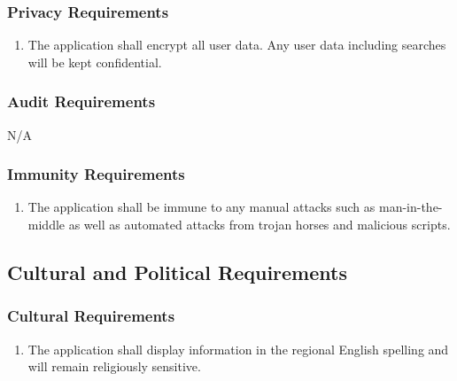 \documentclass[titlepage]{article}
\newcounter{myCounter}
\begin{document}
\subsubsection{Privacy Requirements}
\label{ssub:privacy_requirements}
\begin{enumerate}[{SR}1. ]
    \setcounter{enumi}{\themyCounter}
    \item The application shall encrypt all user data. Any user data including searches will be kept
    confidential.
    \setcounter{myCounter}{\theenumi}
\end{enumerate}

\subsubsection{Audit Requirements}
\label{ssub:audit_requirements}
N/A

\subsubsection{Immunity Requirements}
\label{ssub:immunity_requirements}
\begin{enumerate}[{SR}1. ]
    \setcounter{enumi}{\themyCounter}
    \item The application shall be immune to any manual attacks such as man-in-the-middle as well as
    automated attacks from trojan horses and malicious scripts.
    \setcounter{myCounter}{\theenumi}
\end{enumerate}


\subsection{Cultural and Political Requirements}
\label{sub:cultural_and_political_requirements}
\setcounter{myCounter}{0}

\subsubsection{Cultural Requirements}
\label{ssub:cultural_requirements}
\begin{enumerate}[{CP}1. ]
    \setcounter{enumi}{\themyCounter}
    \item The application shall display information in the regional English spelling and will remain
    religiously sensitive.
    \setcounter{myCounter}{\theenumi}
\end{enumerate}
\end{document}

